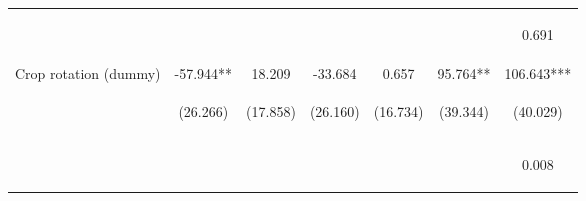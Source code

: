 \begin{center}
\begin{tabular}{lcccccc}
\vspace{4pt} & \begin{footnotesize}[0.159]\end{footnotesize} & \begin{footnotesize}[0.792]\end{footnotesize} & \begin{footnotesize}[0.253]\end{footnotesize} & \begin{footnotesize}[0.544]\end{footnotesize} & \begin{footnotesize}[0.628]\end{footnotesize} & \begin{footnotesize}0.691\end{footnotesize} \\
Crop rotation (dummy) & -57.944** & 18.209 & -33.684 & 0.657 & 95.764** & 106.643*** \\
 & \begin{footnotesize}(26.266)\end{footnotesize} & \begin{footnotesize}(17.858)\end{footnotesize} & \begin{footnotesize}(26.160)\end{footnotesize} & \begin{footnotesize}(16.734)\end{footnotesize} & \begin{footnotesize}(39.344)\end{footnotesize} & \begin{footnotesize}(40.029)\end{footnotesize} \\
\vspace{4pt} & \begin{footnotesize}[0.027]\end{footnotesize} & \begin{footnotesize}[0.308]\end{footnotesize} & \begin{footnotesize}[0.198]\end{footnotesize} & \begin{footnotesize}[0.969]\end{footnotesize} & \begin{footnotesize}[0.015]\end{footnotesize} & \begin{footnotesize}0.008\end{footnotesize} \\

\end{tabular}
\end{center}
